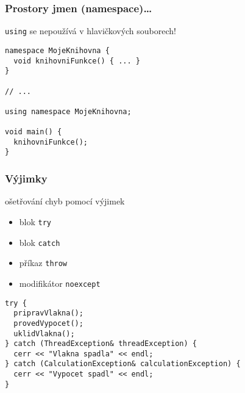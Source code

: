 \begin{frame}[fragile]
\frametitle{Prostory jmen (namespace)\ldots}
\begin{bitemize}
\item \lstinline|using| se nepoužívá v hlavičkových souborech!
\end{bitemize}

\begin{yesblock}
\begin{lstlisting}
namespace MojeKnihovna {
  void knihovniFunkce() { ... }
}

// ... 

using namespace MojeKnihovna;

void main() {
  knihovniFunkce();
}
\end{lstlisting}
\end{yesblock}
\end{frame}





\begin{frame}[fragile]
\frametitle{Výjimky}

\begin{bitemize}
\item ošetřování chyb pomocí výjimek
\begin{itemize}
\item blok \lstinline|try|
\item blok \lstinline|catch|
\item příkaz \lstinline|throw|
\item modifikátor \lstinline|noexcept|
\end{itemize}
\end{bitemize}

\begin{yesblock}
\begin{lstlisting}[basicstyle=\scriptsize]
try {
  pripravVlakna();
  provedVypocet();
  uklidVlakna();
} catch (ThreadException& threadException) {
  cerr << "Vlakna spadla" << endl;
} catch (CalculationException& calculationException) {
  cerr << "Vypocet spadl" << endl;
}
\end{lstlisting}
\end{yesblock}
\end{frame}




